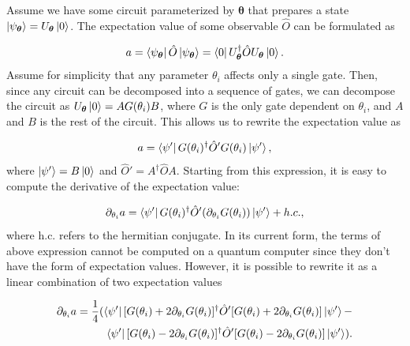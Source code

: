 Assume we have some circuit parameterized by $\boldsymbol{\theta}$ that prepares a state $\ket{\psi_{\boldsymbol{\theta}}} = U_{\boldsymbol{\theta}}\ket{0}$. The expectation value of some observable $\hat{O}$ can be formulated as 

\begin{equation}
    a = \bra{\psi_{\boldsymbol{\theta}}} \hat{O} \ket{\psi_{\boldsymbol{\theta}}} = \bra{0}U_{\boldsymbol{\theta}}^{\dagger}\hat{O}U_{\boldsymbol{\theta}}\ket{0}.
\end{equation}
Assume for simplicity that any parameter $\theta_i$ affects only a single gate. Then, since any circuit can be decomposed into a sequence of gates, we can decompose the circuit as $U_{\boldsymbol{\theta}}\ket{0} = AG(\theta_i)B$, where $G$ is the only gate dependent on $\theta_i$, and $A$ and $B$ is the rest of the circuit. This allows us to rewrite the expectation value as 

\begin{equation}
    a = \bra{\psi'} G(\theta_i)^{\dagger} \hat{O}' G(\theta_i) \ket{\psi'},
\end{equation}
where $\ket{\psi'} = B\ket{0}$ and $\hat{O}' = A^{\dagger}\hat{O}A$. Starting from this expression, it is easy to compute the derivative of the expectation value:

\begin{equation}
    \partial_{\theta_i} a = \bra{\psi'} G(\theta_i)^{\dagger} \hat{O}' (\partial_{\theta_i}G(\theta_i)) \ket{\psi'} + h.c.,
\end{equation}
where h.c. refers to the hermitian conjugate. In its current form, the terms of above expression cannot be computed on a quantum computer since they don't have the form of expectation values. However, it is possible to rewrite it as a linear combination of two expectation values

\begin{equation}\label{eq:generalDeriv}
\begin{aligned}
    \partial_{\theta_i} a = 
    \frac{1}{4}(
    \bra{\psi'} [G(\theta_i)+2\partial_{\theta_i}G(\theta_i)]^{\dagger} \hat{O}' [G(\theta_i)+2\partial_{\theta_i}G(\theta_i)] \ket{\psi'} -\\
    \bra{\psi'} [G(\theta_i)-2\partial_{\theta_i}G(\theta_i)]^{\dagger} \hat{O}' [G(\theta_i)-2\partial_{\theta_i}G(\theta_i)] \ket{\psi'}).
\end{aligned}
\end{equation}

